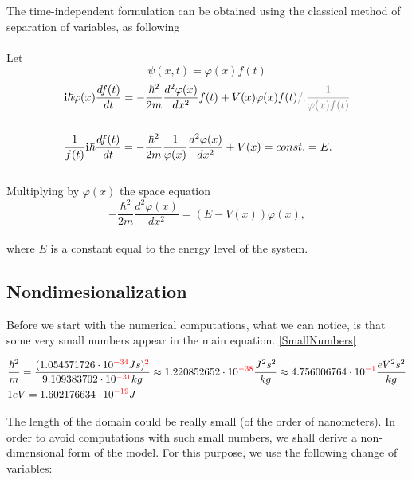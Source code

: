 \documentclass[12pt,a4paper,onecolumn]{article}
\theoremstyle{definition}
\theoremstyle{plain}
\begin{document}
 
The time-independent formulation can be obtained using the classical method of separation of variables, as following\\ \\
Let
\begin{equation*}
    \psi(x,t) = \varphi(x) f(t)
\end{equation*}
\begin{align*}
    &\textbf{i} \hbar  \varphi(x) \frac{d f(t)}{d t} = -\frac{\hbar^2}{2m} \frac{d^2 \varphi(x)}{d x^2} f(t) + V(x)\varphi(x) f(t) \color{gray}{/.\frac{1}{\varphi(x) f(t)}}\\ \\ 
    &\frac{1}{f(t)} \textbf{i} \hbar \frac{d f(t)}{d t} = 
    -\frac{\hbar^2}{2m} \frac{1}{\varphi(x)} \frac{d^2 \varphi(x)}{d x^2} + V(x)=
    const. = E.
\end{align*}\\
 Multiplying by $\varphi(x)$ the space equation\\
\begin{equation}
\label{time-independent-form}
-\frac{\hbar^2}{2m} \frac{d^2 \varphi(x)}{d x^2} = (E-V(x))\varphi(x),
\end{equation}\\
where $E$ is a constant equal to the energy level of the system. \\

\subsection{Nondimesionalization}
Before we start with the numerical computations, what we can notice, is that some very small numbers appear in the main equation. \eqref{SmallNumbers}

\[
\begin{split}
\label{SmallNumbers}
&\frac{\hbar^2}{m}=\frac{(1.054571726\cdot10^{\color{red}{-34}}J s)^{\color{red}{2}}}{9.109383702\cdot 10^{\color{red}{-31}}kg}\approx 1.220852652\cdot 10^{\color{red}{-38}}\frac{J^2 s^2}{kg}\approx 4.756006764\cdot 10^{\color{red}{-1}} \frac{eV^2 s^2}{kg}\\
&1eV = 1.602176634\cdot10^{\color{red}{-19}}J
\end{split}
\]

The length of the domain could be really small (of the order of nanometers). In order to avoid computations with such small numbers, we shall derive a non-dimensional form of the model.
For this purpose, we use the following change of variables:
\end{document}
